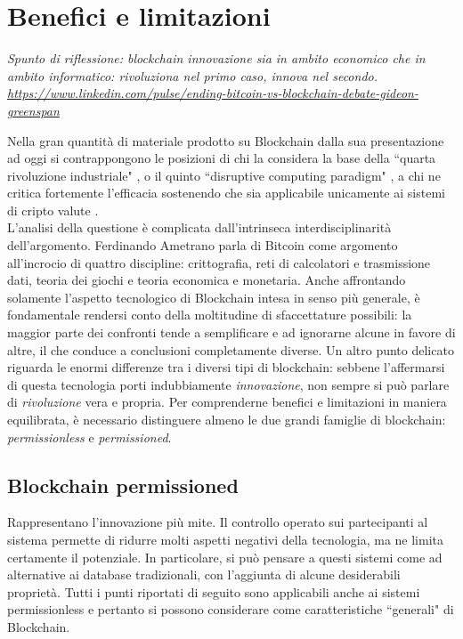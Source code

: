 \section{Benefici e limitazioni}
	\emph{Spunto di riflessione: blockchain innovazione sia in ambito economico che in ambito informatico: rivoluziona nel primo caso, innova nel secondo. \url{https://www.linkedin.com/pulse/ending-bitcoin-vs-blockchain-debate-gideon-greenspan}}
	
	Nella gran quantità di materiale prodotto su Blockchain dalla sua presentazione ad oggi si contrappongono le posizioni di chi la considera la base della ``quarta rivoluzione industriale" \cite{4industrialrevo}, o il quinto ``disruptive computing paradigm" \cite{blockchain_swan}, a chi ne critica fortemente l'efficacia sostenendo che sia applicabile unicamente ai sistemi di cripto valute \cite{what_is_it_good_for}. \\
	L'analisi della questione è complicata dall'intrinseca interdisciplinarità dell'argomento. Ferdinando Ametrano parla di Bitcoin \cite{Ametrano_slides} come argomento all'incrocio di quattro discipline: crittografia, reti di calcolatori e trasmissione dati, teoria dei giochi e teoria economica e monetaria. Anche affrontando solamente l'aspetto tecnologico di Blockchain intesa in senso più generale, è fondamentale rendersi conto della moltitudine di sfaccettature possibili: la maggior parte dei confronti tende a semplificare e ad ignorarne alcune in favore di altre, il che conduce a conclusioni completamente diverse. Un altro punto delicato riguarda le enormi differenze tra i diversi tipi di blockchain: sebbene l'affermarsi di questa tecnologia porti indubbiamente \emph{innovazione}, non sempre si può parlare di \emph{rivoluzione} vera e propria. Per comprenderne benefici e limitazioni in maniera equilibrata, è necessario distinguere almeno le due grandi famiglie di blockchain: \emph{permissionless} e \emph{permissioned}.
	\subsection{Blockchain permissioned}
		Rappresentano l'innovazione più mite. Il controllo operato sui partecipanti al sistema permette di ridurre molti aspetti negativi della tecnologia, ma ne limita certamente il potenziale. In particolare, si può pensare a questi sistemi come ad alternative ai database tradizionali, con l'aggiunta di alcune desiderabili proprietà. Tutti i punti riportati di seguito sono applicabili anche ai sistemi permissionless e pertanto si possono considerare come caratteristiche ``generali" di Blockchain.

